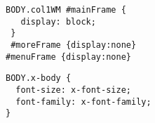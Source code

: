 \documentclass[12pt,a4paper,twosides,ngerman]{scrbook}
\begin{document}
\begin{center}
\begin{minipage}[t]{100mm}
\begin{lstlisting}[captionpos=b, caption=col1WM.css]
 BODY.col1WM #mainFrame {
   display: block;
 }
 #moreFrame {display:none}
#menuFrame {display:none}  
\end{lstlisting}
\end{minipage}
\end{center}   

 

\newpage 

\begin{center}
\begin{minipage}[t]{100mm}
\begin{lstlisting}[captionpos=b, caption=CSS File x-body.css] 
BODY.x-body {
  font-size: x-font-size;
  font-family: x-font-family;
} 
\end{lstlisting}
 \end{minipage}
\end{center}    
\end{document}
